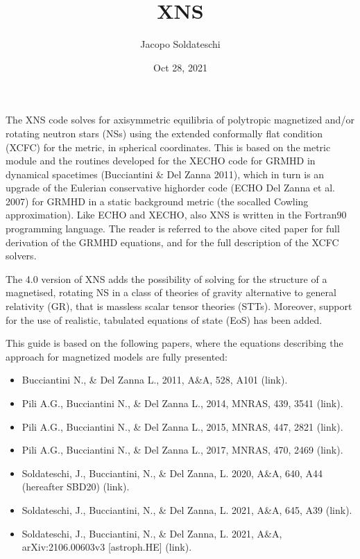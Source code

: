 \documentclass[letterpaper,10pt,english]{sphinxmanual}
\title{XNS}
\date{Oct 28, 2021}
\author{Jacopo Soldateschi}
\begin{document}
\pagestyle{empty}
\sphinxmaketitle
\pagestyle{plain}
\sphinxtableofcontents
\pagestyle{normal}
\label{\detokenize{index::doc}}


\sphinxAtStartPar
The XNS code solves for axisymmetric equilibria of polytropic magnetized and/or rotating neutron stars (NSs) using the extended conformally flat condition (XCFC) for the metric, in spherical coordinates. This is based on the metric module and the routines developed for the X\sphinxhyphen{}ECHO code for GRMHD in dynamical spacetimes (Bucciantini \& Del Zanna 2011), which in turn is an upgrade of the Eulerian conservative high\sphinxhyphen{}order code (ECHO Del Zanna et al. 2007) for GRMHD in a static background metric (the so\sphinxhyphen{}called Cowling approximation). Like ECHO and X\sphinxhyphen{}ECHO, also XNS is written in the Fortran90 programming language. The reader is referred to the above cited paper for full derivation of the GRMHD equations, and for the full description of the XCFC solvers.

\sphinxAtStartPar
The 4.0 version of XNS adds the possibility of solving for the structure of a magnetised, rotating NS in a class of theories of gravity alternative to general relativity (GR), that is massless scalar tensor theories (STTs). Moreover, support for the use of realistic, tabulated equations of state (EoS) has been added.

\sphinxAtStartPar
This guide is based on the following papers, where the equations describing the approach for magnetized models are fully presented:
\begin{itemize}
\item {} 
\sphinxAtStartPar
Bucciantini N., \& Del Zanna L., 2011, A\&A, 528, A101 (link).

\item {} 
\sphinxAtStartPar
Pili A.G., Bucciantini N., \& Del Zanna L., 2014, MNRAS, 439, 3541 (link).

\item {} 
\sphinxAtStartPar
Pili A.G., Bucciantini N., \& Del Zanna L., 2015, MNRAS, 447, 2821 (link).

\item {} 
\sphinxAtStartPar
Pili A.G., Bucciantini N., \& Del Zanna L., 2017, MNRAS, 470, 2469 (link).

\item {} 
\sphinxAtStartPar
Soldateschi, J., Bucciantini, N., \& Del Zanna, L. 2020, A\&A, 640, A44 (hereafter SBD20) (link).

\item {} 
\sphinxAtStartPar
Soldateschi, J., Bucciantini, N., \& Del Zanna, L. 2021, A\&A, 645, A39 (link).

\item {} 
\sphinxAtStartPar
Soldateschi, J., Bucciantini, N., \& Del Zanna, L. 2021, A\&A, arXiv:2106.00603v3 {[}astro\sphinxhyphen{}ph.HE{]} (link).

\end{itemize}
\end{document}
